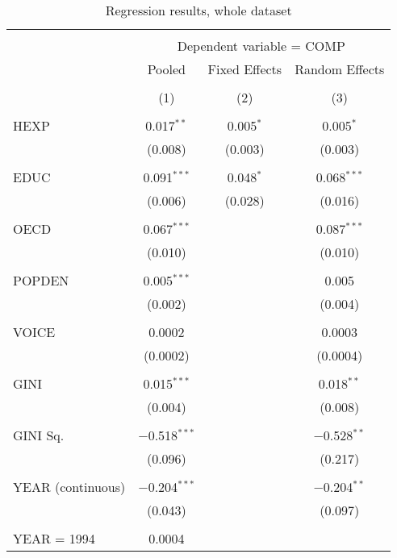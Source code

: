 \documentclass[12pt,a4paper]{article}\usepackage[]{graphicx}\usepackage[]{color}
\begin{document}
\begin{table}[!htbp] \centering 
  \caption{Regression results, whole dataset} 
  \label{tab:big} 
\begin{tabular}{@{\extracolsep{5pt}}lccc} 
\\[-1.8ex]\hline 
\hline \\[-1.8ex] 
 & \multicolumn{3}{c}{Dependent variable = COMP} \\ 
\cline{2-4} 
 & Pooled & Fixed Effects & Random Effects \\ 
\\[-1.8ex] & (1) & (2) & (3)\\ 
\hline \\[-1.8ex] 
 HEXP & 0.017$^{**}$ & 0.005$^{*}$ & 0.005$^{*}$ \\ 
  & (0.008) & (0.003) & (0.003) \\ 
  & & & \\ 
 EDUC & 0.091$^{***}$ & 0.048$^{*}$ & 0.068$^{***}$ \\ 
  & (0.006) & (0.028) & (0.016) \\ 
  & & & \\ 
 OECD & 0.067$^{***}$ &  & 0.087$^{***}$ \\ 
  & (0.010) &  & (0.010) \\ 
  & & & \\ 
 POPDEN & 0.005$^{***}$ &  & 0.005 \\ 
  & (0.002) &  & (0.004) \\ 
  & & & \\ 
 VOICE & 0.0002 &  & 0.0003 \\ 
  & (0.0002) &  & (0.0004) \\ 
  & & & \\ 
 GINI & 0.015$^{***}$ &  & 0.018$^{**}$ \\ 
  & (0.004) &  & (0.008) \\ 
  & & & \\ 
 GINI Sq. & $-$0.518$^{***}$ &  & $-$0.528$^{**}$ \\ 
  & (0.096) &  & (0.217) \\ 
  & & & \\ 
 YEAR (continuous) & $-$0.204$^{***}$ &  & $-$0.204$^{**}$ \\ 
  & (0.043) &  & (0.097) \\ 
  & & & \\ 
 YEAR = 1994 & 0.0004 &  &  \\ 

\end{tabular}
\end{table}
\end{document}
